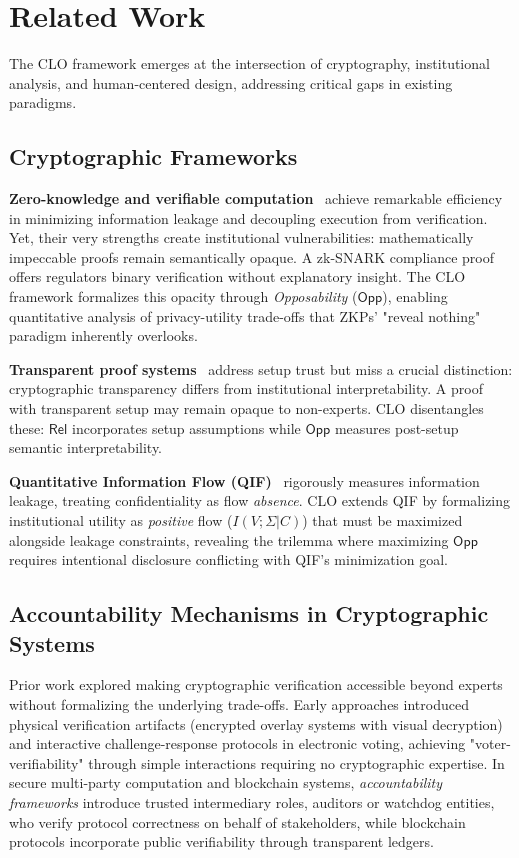 \documentclass{ieeeaccess}
\begin{document}
\section{Related Work}\label{sec:related_work}

The CLO framework emerges at the intersection of cryptography, institutional analysis, and human-centered design, addressing critical gaps in existing paradigms.

\subsection{Cryptographic Frameworks}

\textbf{Zero-knowledge and verifiable computation}~\cite{GMR85,Groth16,Gennaro13,Wahby18} achieve remarkable efficiency in minimizing information leakage and decoupling execution from verification. Yet, their very strengths create institutional vulnerabilities: mathematically impeccable proofs remain semantically opaque. A zk-SNARK compliance proof offers regulators binary verification without explanatory insight. The CLO framework formalizes this opacity through \emph{Opposability} ($\mathsf{Opp}$), enabling quantitative analysis of privacy-utility trade-offs that ZKPs' "reveal nothing" paradigm inherently overlooks.

\textbf{Transparent proof systems}~\cite{Bunz19,Boneh20} address setup trust but miss a crucial distinction: cryptographic transparency differs from institutional interpretability. A proof with transparent setup may remain opaque to non-experts. CLO disentangles these: $\mathsf{Rel}$ incorporates setup assumptions while $\mathsf{Opp}$ measures post-setup semantic interpretability.

\textbf{Quantitative Information Flow (QIF)}~\cite{Clarkson05,Alvim12} rigorously measures information leakage, treating confidentiality as flow \emph{absence}. CLO extends QIF by formalizing institutional utility as \emph{positive} flow ($I(V;\Sigma|C)$) that must be maximized alongside leakage constraints, revealing the trilemma where maximizing $\mathsf{Opp}$ requires intentional disclosure conflicting with QIF's minimization goal.

\subsection{Accountability Mechanisms in Cryptographic Systems}

Prior work explored making cryptographic verification accessible beyond experts without formalizing the underlying trade-offs. Early approaches introduced physical verification artifacts (encrypted overlay systems with visual decryption) and interactive challenge-response protocols in electronic voting, achieving "voter-verifiability" through simple interactions requiring no cryptographic expertise. In secure multi-party computation and blockchain systems, \emph{accountability frameworks} introduce trusted intermediary roles, auditors or watchdog entities, who verify protocol correctness on behalf of stakeholders, while blockchain protocols incorporate public verifiability through transparent ledgers.
\end{document}
